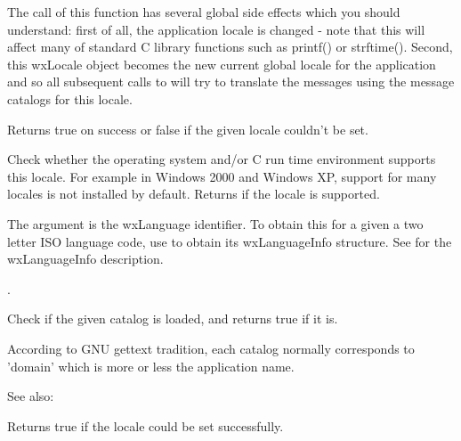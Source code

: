 The call of this function has several global side effects which you should
understand: first of all, the application locale is changed - note that this
will affect many of standard C library functions such as printf() or strftime().
Second, this wxLocale object becomes the new current global locale for the
application and so all subsequent calls to
 will try to
translate the messages using the message catalogs for this locale.

Returns true on success or false if the given locale couldn't be set.


\label{wxlocaleisavailable}


Check whether the operating system and/or C run time environment supports
this locale. For example in Windows 2000 and Windows XP, support for many
locales is not installed by default. Returns \true if the locale is
supported.

The argument  is the wxLanguage identifier. To obtain this for a
given a two letter ISO language code, use 
 to obtain its
wxLanguageInfo structure. See  for
the wxLanguageInfo description.

. 


\label{wxlocaleisloaded}


Check if the given catalog is loaded, and returns true if it is.

According to GNU gettext tradition, each catalog
normally corresponds to 'domain' which is more or less the application name.

See also: 


\label{wxlocaleisok}


Returns true if the locale could be set successfully.

